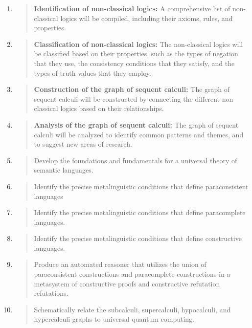 \begin{enumerate}
\def\labelenumi{\arabic{enumi}.}
\item
  \begin{quote}
  \textbf{Identification of non-classical logics:} A comprehensive list
  of non-classical logics will be compiled, including their axioms,
  rules, and properties.
  \end{quote}
\item
  \begin{quote}
  \textbf{Classification of non-classical logics:} The non-classical
  logics will be classified based on their properties, such as the types
  of negation that they use, the consistency conditions that they
  satisfy, and the types of truth values that they employ.
  \end{quote}
\item
  \begin{quote}
  \textbf{Construction of the graph of sequent calculi:} The graph of
  sequent calculi will be constructed by connecting the different
  non-classical logics based on their relationships.
  \end{quote}
\item
  \begin{quote}
  \textbf{Analysis of the graph of sequent calculi:} The graph of
  sequent calculi will be analyzed to identify common patterns and
  themes, and to suggest new areas of research.
  \end{quote}
\item
  \begin{quote}
  Develop the foundations and fundamentals for a universal theory of
  semantic languages.
  \end{quote}
\item
  \begin{quote}
  Identify the precise metalinguistic conditions that define
  paraconsistent languages
  \end{quote}
\item
  \begin{quote}
  Identify the precise metalinguistic conditions that define
  paracomplete languages.
  \end{quote}
\item
  \begin{quote}
  Identify the precise metalinguistic conditions that define
  constructive languages.
  \end{quote}
\item
  \begin{quote}
  Produce an automated reasoner that utilizes the union of
  paraconsistent constructions and paracomplete constructions in a
  metasystem of constructive proofs and constructive refutation
  refutations.
  \end{quote}
\item
  \begin{quote}
  Schematically relate the subcalculi, supercalculi, hypocalculi, and
  hypercalculi graphs to universal quantum computing.
  \end{quote}
\end{enumerate}

